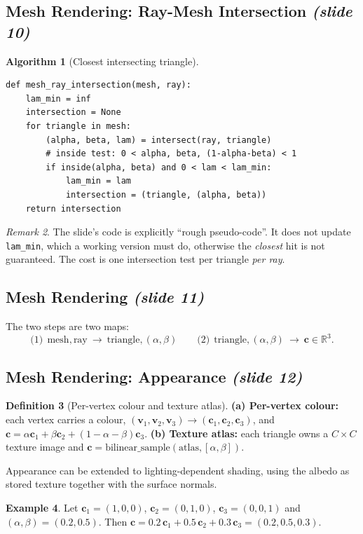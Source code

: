\documentclass[11pt,a4paper]{article}
\newcommand{\R}{\mathbb{R}}
\newcommand{\sr}[1]{\texorpdfstring{\emph{(#1)}}{(#1)}}
\theoremstyle{definition}
\newtheorem{definition}{Definition}[section]
\newtheorem{example}[definition]{Example}
\theoremstyle{algstyle}
\newtheorem{algorithm}[definition]{Algorithm}
\theoremstyle{plain}
\theoremstyle{remark}
\newtheorem{remark}[definition]{Remark}
\begin{document}
\subsection{Mesh Rendering: Ray-Mesh Intersection \sr{slide 10}}
\begin{algorithm}[Closest intersecting triangle]
\begin{lstlisting}
def mesh_ray_intersection(mesh, ray):
    lam_min = inf
    intersection = None
    for triangle in mesh:
        (alpha, beta, lam) = intersect(ray, triangle)
        # inside test: 0 < alpha, beta, (1-alpha-beta) < 1
        if inside(alpha, beta) and 0 < lam < lam_min:
            lam_min = lam
            intersection = (triangle, (alpha, beta))
    return intersection
\end{lstlisting}
\end{algorithm}

\begin{remark}
The slide's code is explicitly ``rough pseudo-code''. It does not update \texttt{lam\_min}, which a working version must do, otherwise the \emph{closest} hit is not guaranteed. The cost is one intersection test per triangle \emph{per ray}.
\end{remark}

\subsection{Mesh Rendering \sr{slide 11}}
The two steps are two maps:
\[
\text{(1)}\ \ \text{mesh},\text{ray}\ \to\ \text{triangle},(\alpha,\beta)
\qquad
\text{(2)}\ \ \text{triangle},(\alpha,\beta)\ \to\ \bm c\in\R^3 .
\]

\subsection{Mesh Rendering: Appearance \sr{slide 12}}
\begin{definition}[Per-vertex colour and texture atlas]
\textbf{(a) Per-vertex colour:} each vertex carries a colour, $(\bm v_1,\bm v_2,\bm v_3)\to(\bm c_1,\bm c_2,\bm c_3)$, and
$\bm c=\alpha\bm c_1+\beta\bm c_2+(1-\alpha-\beta)\bm c_3$.
\textbf{(b) Texture atlas:} each triangle owns a $C\times C$ texture image and $\bm c=\text{bilinear\_sample}(\text{atlas},[\alpha,\beta])$.
\end{definition}
Appearance can be extended to lighting-dependent shading, using the albedo as stored texture together with the surface normals.

\begin{example}
Let $\bm c_1=(1,0,0)$, $\bm c_2=(0,1,0)$, $\bm c_3=(0,0,1)$ and $(\alpha,\beta)=(0.2,0.5)$. Then $\bm c=0.2\,\bm c_1+0.5\,\bm c_2+0.3\,\bm c_3=(0.2,0.5,0.3)$.
\end{example}
\end{document}
